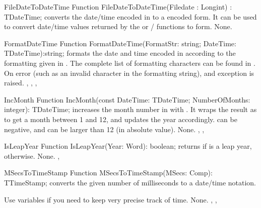 

 
\begin{function}{FileDateToDateTime}
\Declaration
Function FileDateToDateTime(Filedate : Longint) : TDateTime;
\Description
{} converts the date/time encoded in 
to a  encoded form. It can be used to convert date/time values 
returned by the  or / 
functions to  form.
\Errors
None.
\SeeAlso
{}
\end{function}


 
\begin{function}{FormatDateTime}
\Declaration
Function FormatDateTime(FormatStr: string; DateTime: TDateTime):string;
\Description
{} formats the date and time encoded in 
according to the formatting given in . The complete list 
of formatting characters can be found in .
\Errors
On error (such as an invalid character in the formatting string), and
 exception is raised.
\SeeAlso
{}, , ,
\end{function}



 
\begin{function}{IncMonth}
\Declaration
Function IncMonth(const DateTime: TDateTime; NumberOfMonths: integer): TDateTime;
\Description
{} increases the month number in  with
. It wraps the result as to get a month between 1 and
12, and updates the year accordingly.  can be negative,
and can be larger than 12 (in absolute value).
\Errors
None.
\SeeAlso
{}, , 
\end{function}



 
\begin{function}{IsLeapYear}
\Declaration
Function IsLeapYear(Year: Word): boolean;
\Description
{} returns  if  is a leap year,
 otherwise.
\Errors
None.
\SeeAlso
{}, 
\end{function}


 
\begin{function}{MSecsToTimeStamp}
\Declaration
Function MSecsToTimeStamp(MSecs: Comp): TTimeStamp;
\Description
{} converts the given number of milliseconds to
a  date/time notation.

Use  variables if you need to keep very precise track of
time.
\Errors
None.
\SeeAlso
{}, , 
\end{function}

